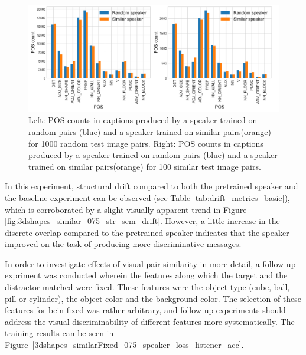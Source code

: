 \begin{figure}
	\centering
	\includegraphics[width=\linewidth]{images/3dshapes_random_vs_similar_POS_counts.png}
	\caption{Left: POS counts in captions produced by a speaker trained on random pairs (blue) and a speaker trained on similar pairs(orange) for 1000 random test image pairs. Right: POS counts in captions produced by a speaker trained on random pairs (blue) and a speaker trained on similar pairs(orange) for 100 similar test image pairs. }
	\label{fig:3dshapes_pos}
\end{figure}

In this experiment, structural drift compared to both the pretrained speaker and the baseline experiment can be observed (see Table \ref{tab:drift_metrics_basic}), which is corroborated by a slight visually apparent trend in Figure \ref{fig:3dshapes_similar_075_str_sem_drift}. However, a little increase in the discrete overlap compared to the pretrained speaker indicates that the speaker improved on the task of producing more discriminative messages.

In order to investigate effects of visual pair similarity in more detail, a follow-up expriment was conducted wherein the features along which the target and the distractor matched were fixed. These features were the object type (cube, ball, pill or cylinder), the object color and the background color. The selection of these features for bein fixed was rather arbitrary, and follow-up experiments should address the visual discriminability of different features more systematically. The training results can be seen in Figure~\ref{3dshapes_similarFixed_075_speaker_loss_listener_acc}.

